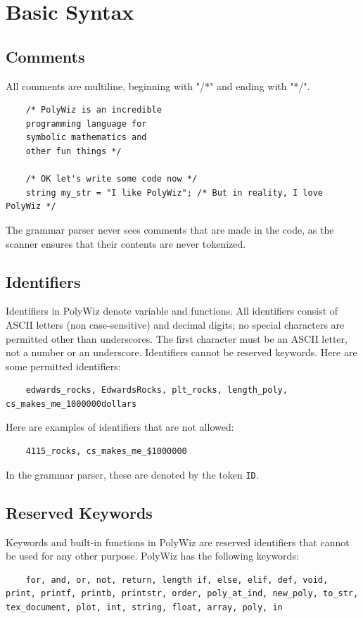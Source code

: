 \documentclass{article}
\begin{document}
\section{Basic Syntax}
\subsection{Comments}
All comments are multiline, beginning with "/*" and ending with "*/".
\begin{lstlisting}
    /* PolyWiz is an incredible
    programming language for
    symbolic mathematics and
    other fun things */
    
    /* OK let's write some code now */
    string my_str = "I like PolyWiz"; /* But in reality, I love PolyWiz */
    \end{lstlisting}

The grammar parser never sees comments that are made in the code, as the scanner ensures that their contents are never tokenized.

\subsection{Identifiers}
Identifiers in PolyWiz denote variable and functions. All identifiers consist of ASCII letters (non case-sensitive) and decimal digits; no special characters are permitted other than underscores. The first character must be an ASCII letter, not a number or an underscore. Identifiers cannot be reserved keywords. Here are some permitted identifiers:
\begin{lstlisting}
    edwards_rocks, EdwardsRocks, plt_rocks, length_poly, cs_makes_me_1000000dollars
    \end{lstlisting}
Here are examples of identifiers that are not allowed:
\begin{lstlisting}
    4115_rocks, cs_makes_me_$1000000
    \end{lstlisting}

In the grammar parser, these are denoted by the token \lstinline{ID}.

\subsection{Reserved Keywords}
Keywords and built-in functions in PolyWiz are reserved identifiers that cannot be used for any other purpose. PolyWiz has the following keywords:
\begin{lstlisting}
    for, and, or, not, return, length if, else, elif, def, void, print, printf, printb, printstr, order, poly_at_ind, new_poly, to_str, tex_document, plot, int, string, float, array, poly, in
    \end{lstlisting}
\end{document}
